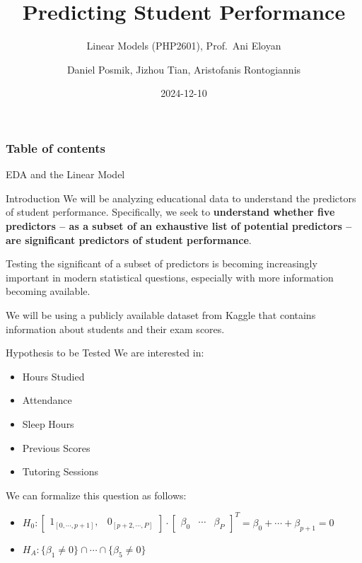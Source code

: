 \documentclass[
  ignorenonframetext,
]{beamer}
\title{Predicting Student Performance}
\subtitle{Linear Models (PHP2601), Prof.~Ani Eloyan}
\author{Daniel Posmik, Jizhou Tian, Aristofanis Rontogiannis}
\date{2024-12-10}
\providecommand{\tightlist}{%
  \setlength{\itemsep}{0pt}\setlength{\parskip}{0pt}}\usepackage{longtable,booktabs,array}
\renewcommand*\contentsname{Table of contents}
\newcommand\contentsname{Table of contents}
\begin{document}
\frame{\titlepage}

\renewcommand*\contentsname{Table of contents}
\begin{frame}[allowframebreaks]
  \frametitle{Table of contents}
  \tableofcontents[hideallsubsections]
\end{frame}
\begin{frame}[fragile]{EDA and the Linear Model}
\label{eda-and-the-linear-model}
\begin{block}{Introduction}
\label{introduction}
We will be analyzing educational data to understand the predictors of
student performance. Specifically, we seek to \textbf{understand whether
five predictors -- as a subset of an exhaustive list of potential
predictors -- are significant predictors of student performance}.

Testing the significant of a subset of predictors is becoming
increasingly important in modern statistical questions, especially with
more information becoming available.

We will be using a publicly available dataset from Kaggle that contains
information about students and their exam scores.
\end{block}

\begin{block}{Hypothesis to be Tested}
\label{hypothesis-to-be-tested}
We are interested in:

\begin{itemize}
\tightlist
\item
  Hours Studied
\item
  Attendance
\item
  Sleep Hours
\item
  Previous Scores
\item
  Tutoring Sessions
\end{itemize}

We can formalize this question as follows:

\begin{itemize}
\tightlist
\item
  \(H_0: \begin{bmatrix} 1_{[0, \cdots, p+1]}, & 0_{[p+2, \cdots, P]} \end{bmatrix} \cdot \begin{bmatrix} \beta_0 & \cdots & \beta_{P} \end{bmatrix}^T = \beta_0 + \cdots + \beta_{p+1} = 0\)
\item
  \(H_A: \{\beta_1 \neq 0\} \cap \cdots \cap \{\beta_5 \neq 0\}\)
\end{itemize}


\end{block}
\end{frame}
\end{document}
